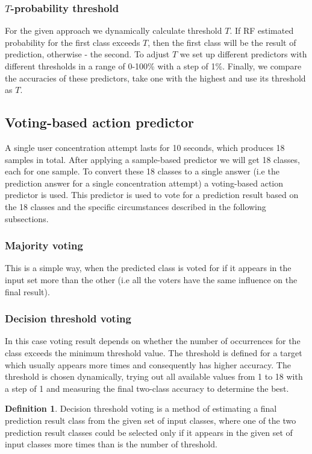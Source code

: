\documentclass[12pt]{article}
\theoremstyle{definition}
\newtheorem{definition}{Definition}[section]
\begin{document}
\subsubsection{$T$-probability threshold}
For the given approach we dynamically calculate threshold $T$. If RF estimated probability for the first class exceeds $T$, then the first class will be the result of prediction, otherwise - the second. To adjust $T$ we set up different predictors with different thresholds in a range of 0-100\% with a step of 1\%. Finally, we compare the accuracies of these predictors, take one with the highest and use its threshold as $T$.

\subsection{Voting-based action predictor}
A single user concentration attempt lasts for 10 seconds, which produces 18 samples in total. After applying a sample-based predictor we will get 18 classes, each for one sample. To convert these 18 classes to a single answer (i.e the prediction answer for a single concentration attempt) a voting-based action predictor is used. This predictor is used to vote for a prediction result based on the 18 classes and the specific circumstances described in the following subsections.

\subsubsection{Majority voting}
This is a simple way, when the predicted class is voted for if it appears in the input set more than the other (i.e all the voters have the same influence on the final result).

\subsubsection{Decision threshold voting}
In this case voting result depends on whether the number of occurrences for the class exceeds the minimum threshold value. The threshold is defined for a target which usually appears more times and consequently has higher accuracy. The threshold is chosen dynamically, trying out all available values from 1 to 18 with a step of 1 and measuring the final two-class accuracy to determine the best. 

\theoremstyle{definition}
\begin{definition}
Decision threshold voting is a method of estimating a final prediction result class from the given set of input classes, where one of the two prediction result classes could be selected only if it appears in the given set of input classes more times than is the number of threshold.
\end{definition}
\end{document}
